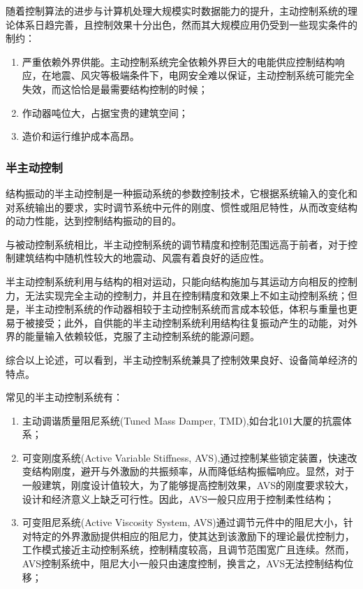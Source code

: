 随着控制算法的进步与计算机处理大规模实时数据能力的提升，主动控制系统的理论体系日趋完善，且控制效果十分出色，然而其大规模应用仍受到一些现实条件的制约：
\begin{enumerate}
	\item 严重依赖外界供能。主动控制系统完全依赖外界巨大的电能供应控制结构响应，在地震、风灾等极端条件下，电网安全难以保证，主动控制系统可能完全失效，而这恰恰是最需要结构控制的时候；
	\item 作动器吨位大，占据宝贵的建筑空间\cite{lou2013}；
	\item 造价和运行维护成本高昂。
\end{enumerate}

\subsubsection{半主动控制}
结构振动的半主动控制是一种振动系统的参数控制技术，它根据系统输入的变化和对系统输出的要求，实时调节系统中元件的刚度、惯性或阻尼特性，从而改变结构的动力性能，达到控制结构振动的目的。

与被动控制系统相比，半主动控制系统的调节精度和控制范围远高于前者，对于控制建筑结构中随机性较大的地震动、风震有着良好的适应性。

半主动控制系统利用与结构的相对运动，只能向结构施加与其运动方向相反的控制力，无法实现完全主动的控制力，并且在控制精度和效果上不如主动控制系统；但是，半主动控制系统的作动器相较于主动控制系统而言成本较低，体积与重量也更易于被接受；此外，自供能的半主动控制系统利用结构往复振动产生的动能，对外界的能量输入依赖较低，克服了主动控制系统的能源问题。

综合以上论述，可以看到，半主动控制系统兼具了控制效果良好、设备简单经济的特点。

常见的半主动控制系统有：
\begin{enumerate}[leftmargin=*,labelindent=16pt,label=\bfseries \arabic*.]
	\item 主动调谐质量阻尼系统(Tuned Mass Damper, TMD),如台北101大厦的抗震体系；
	\item 可变刚度系统(Active Variable Stiffness, AVS),通过控制某些锁定装置，快速改变结构刚度，避开与外激励的共振频率，从而降低结构振幅响应。\cite{Lijing2006}显然，对于一般建筑，刚度设计值较大，为了能够提高控制效果，AVS的刚度要求较大，设计和经济意义上缺乏可行性。因此，AVS一般只应用于控制柔性结构；
	\item 可变阻尼系统(Active Viscosity System, AVS)通过调节元件中的阻尼大小，针对特定的外界激励提供相应的阻尼力，使其达到该激励下的理论最优控制力，工作模式接近主动控制系统，控制精度较高，且调节范围宽广且连续。然而，AVS控制系统中，阻尼大小一般只由速度控制，换言之，AVS无法控制结构位移；
\end{enumerate}

